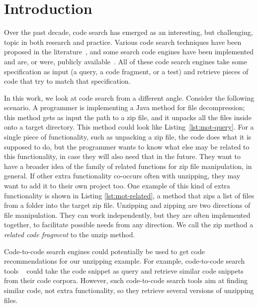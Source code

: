 \section{Introduction}
\label{sec:intro}

Over the past decade, code search has emerged as an interesting, but
challenging, topic in both research and practice. Various code search
techniques have been proposed in the
literature~\cite{bajracharya2009sourcerer,reiss2009semantics,lazzarini2009applying,mcmillan2012exemplar}, and
some search code engines have been implemented and are, or were, publicly
available~\cite{googlesearch, github,codase,krugle,ohloh,searchcode}. All
of these code search engines take some specification as input (a
query, a code fragment, or a test) and retrieve pieces of code that try
to match that specification.


In this work, we look at code search from a different angle. Consider
the following scenario. A programmer is implementing a Java method for
file decompression; this method gets as input the path to a zip file,
and it unpacks all the files inside onto a target directory. This
method could look like Listing~\ref{lst:mot-query}. For a single piece
of functionality, such as unpacking a zip file, the code does what it
is supposed to do, but the programmer wants to know what else may be
related to this functionality, in case they will also need that in the
future. They want to have a broader idea of the family of related
functions for zip file manipulation, in general. If other extra
functionality co-occurs often with unzipping, they may want to add it
to their own project too. One example of this kind of extra
functionality is shown in Listing \ref{lst:mot-related}, a method that
zips a list of files from a folder into the target zip file. Unzipping
and zipping are two directions of file manipulation. They can work
independently, but they are often implemented together, to facilitate
possible needs from any direction. We call the zip method a
\textit{related code fragment} to the unzip method.



Code-to-code search engines could potentially be used to get code
recommendations for our unzipping example. For example, code-to-code search tools
~\cite{kim2018Facoy, krugle, searchcode} could take the code snippet
as query and retrieve similar code snippets from their code
corpora. However, such code-to-code search tools aim at finding
similar code, not extra functionality, so they retrieve several
versions of unzipping files. 

